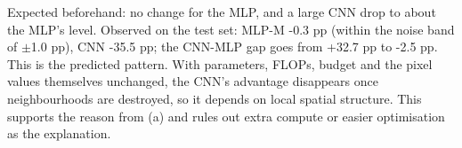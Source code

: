 Expected beforehand: no change for the MLP, and a large CNN drop to about the MLP's level. Observed on the test set: MLP-M -0.3 pp (within the noise band of $\pm$1.0 pp), CNN -35.5 pp; the CNN-MLP gap goes from +32.7 pp to -2.5 pp. This is the predicted pattern. With parameters, FLOPs, budget and the pixel values themselves unchanged, the CNN's advantage disappears once neighbourhoods are destroyed, so it depends on local spatial structure. This supports the reason from (a) and rules out extra compute or easier optimisation as the explanation.
